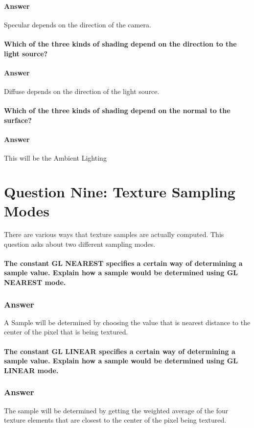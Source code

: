 \documentclass{report}
\begin{document}
\subsection{Answer}
Specular depends on the direction of the camera.
\subsection{ Which of the three kinds of shading depend on the direction to the light source?}
\subsection{Answer}
Diffuse depends on the direction of the light source.
\subsection{ Which of the three kinds of shading depend on the normal to the surface?}
\subsection{Answer}
This will be the Ambient Lighting
\part{Question Nine: Texture Sampling Modes}
There are various ways that texture samples are actually computed. This question asks about two different sampling modes.
\subsection{ The constant GL NEAREST specifies a certain way of determining a sample value. Explain how a sample would be determined using GL NEAREST mode.}
\section{Answer}
A Sample will be determined by choosing the value that is nearest distance to the center of the pixel that is being textured.
\subsection{ The constant GL LINEAR specifies a certain way of determining a sample value. Explain how a sample would be determined using GL LINEAR mode.}
\section{Answer}
The sample will be determined by getting the weighted average of the four texture elements that are closest to the center of the pixel being textured.
\end{document}
